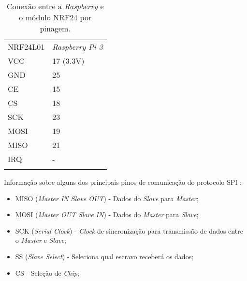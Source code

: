   \begin{table}[h]
 \centering
 {\renewcommand\arraystretch{1.25}
 \caption{Conexão entre a \emph{Raspberry} e o módulo NRF24 por pinagem.}
 \begin{tabular}{ l l }
  \cline{1-1}\cline{2-2}  
    \multicolumn{1}{|p{3.850cm}|}{NRF24L01 \centering } &
    \multicolumn{1}{p{4.217cm}|}{\emph{Raspberry Pi 3} \centering }
  \\  
  \cline{1-1}\cline{2-2}  
    \multicolumn{1}{|p{3.850cm}|}{VCC \centering } &
    \multicolumn{1}{p{4.217cm}|}{17 (3.3V) \centering }
  \\  
  \cline{1-1}\cline{2-2}  
    \multicolumn{1}{|p{3.850cm}|}{GND \centering } &
    \multicolumn{1}{p{4.217cm}|}{25  \centering }
  \\  
  \cline{1-1}\cline{2-2}  
    \multicolumn{1}{|p{3.850cm}|}{CE \centering } &
    \multicolumn{1}{p{4.217cm}|}{15 \centering }
  \\  
  \cline{1-1}\cline{2-2}  
    \multicolumn{1}{|p{3.850cm}|}{CS \centering } &
    \multicolumn{1}{p{4.217cm}|}{18 \centering }
  \\  
  \cline{1-1}\cline{2-2}  
    \multicolumn{1}{|p{3.850cm}|}{SCK \centering } &
    \multicolumn{1}{p{4.217cm}|}{23 \centering }
  \\  
  \cline{1-1}\cline{2-2}  
    \multicolumn{1}{|p{3.850cm}|}{MOSI \centering } &
    \multicolumn{1}{p{4.217cm}|}{19 \centering }
  \\  
  \cline{1-1}\cline{2-2}  
    \multicolumn{1}{|p{3.850cm}|}{MISO \centering } &
    \multicolumn{1}{p{4.217cm}|}{21 \centering }
  \\  
  \cline{1-1}\cline{2-2}  
    \multicolumn{1}{|p{3.850cm}|}{IRQ \centering } &
    \multicolumn{1}{p{4.217cm}|}{- \centering }
  \\  
  \hline
\label{tabelanrf}
 \end{tabular} }
\end{table}  
Informação sobre alguns dos principais pinos de comunicação do protocolo SPI \cite{spi1}:  
\begin{itemize}
\item MISO (\emph{Master IN Slave OUT}) - Dados do \emph{Slave} para \emph{Master};
\item MOSI (\emph{Master OUT Slave IN}) - Dados do \emph{Master} para \emph{Slave};
\item SCK (\emph{Serial Clock}) - \emph{Clock} de sincronização para transmissão de dados entre o \emph{Master} e \emph{Slave};
\item SS (\emph{Slave Select}) - Seleciona qual escravo receberá os dados;
\item CS - Seleção de \emph{Chip};
\end{itemize}
